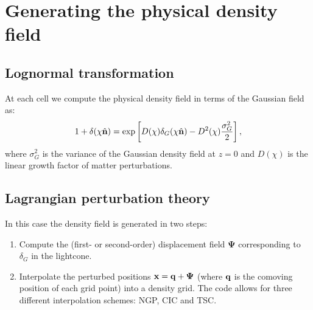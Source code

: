 \documentclass[a4paper,10pt]{article}
\newcommand{\nv}{\hat{\bf n}}
\newcommand{\disp}{\boldsymbol{\Psi}}
\begin{document}
\section{Generating the physical density field}
  \subsection{Lognormal transformation}
    At each cell we compute the physical density field in terms of the Gaussian field
    as:
    \begin{equation}
      1+\delta(\chi\nv)=\exp\left[D(\chi)\delta_G(\chi\nv)-
                                D^2(\chi)\frac{\sigma_G^2}{2}\right],
    \end{equation}
    where $\sigma_G^2$ is the variance of the Gaussian density field at $z=0$ and
    $D(\chi)$ is the linear growth factor of matter perturbations.

  \subsection{Lagrangian perturbation theory}
    In this case the density field is generated in two steps:
    \begin{enumerate}
      \item Compute the (first- or second-order) displacement field $\disp$
            corresponding to $\delta_G$ in the lightcone.
      \item Interpolate the perturbed positions ${\bf x}={\bf q}+\disp$
            (where ${\bf q}$ is the comoving position of each grid point)
            into a density grid. The code allows for three different interpolation
            schemes: NGP, CIC and TSC.
    \end{enumerate}
\end{document}
